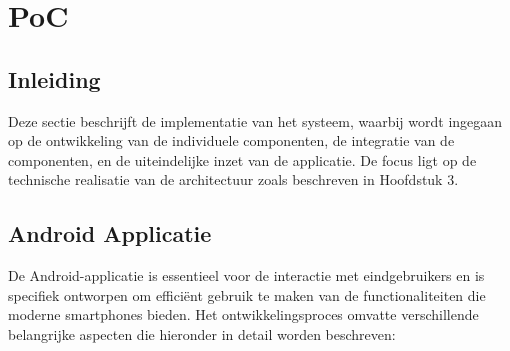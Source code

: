 \chapter{PoC}%
\label{ch:PoC}


\section{Inleiding}
Deze sectie beschrijft de implementatie van het systeem, waarbij wordt ingegaan op de ontwikkeling van de individuele componenten, de integratie van de componenten, en de uiteindelijke inzet van de applicatie. De focus ligt op de technische realisatie van de architectuur zoals beschreven in Hoofdstuk 3.


\section{Android Applicatie}
De Android-applicatie \autocite{VisionAndroid} is essentieel voor de interactie met eindgebruikers en is specifiek ontworpen om efficiënt gebruik te maken van de functionaliteiten die moderne smartphones bieden. Het ontwikkelingsproces omvatte verschillende belangrijke aspecten die hieronder in detail worden beschreven:

